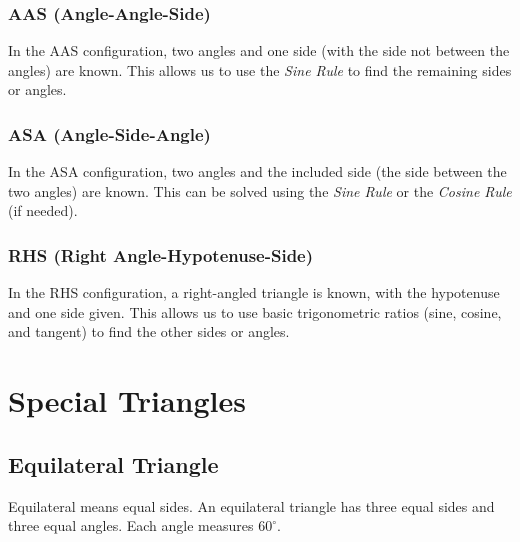 \documentclass[12pt,a4paper]{article}
\begin{document}
\subsubsection*{AAS (Angle-Angle-Side)}
In the AAS configuration, two angles and one side (with the side not between the angles) are known. This allows us to use the \textit{Sine Rule} to find the remaining sides or angles.

\subsubsection*{ASA (Angle-Side-Angle)}
In the ASA configuration, two angles and the included side (the side between the two angles) are known. This can be solved using the \textit{Sine Rule} or the \textit{Cosine Rule} (if needed).

\subsubsection*{RHS (Right Angle-Hypotenuse-Side)}
In the RHS configuration, a right-angled triangle is known, with the hypotenuse and one side given. This allows us to use basic trigonometric ratios (sine, cosine, and tangent) to find the other sides or angles.

\section*{Special Triangles}\label{sec:special-triangles}
\subsection*{Equilateral Triangle}
Equilateral means equal sides. An equilateral triangle has three equal sides and three equal angles. Each angle measures $60^\circ$.

\begin{center}
\end{center}
\end{document}
